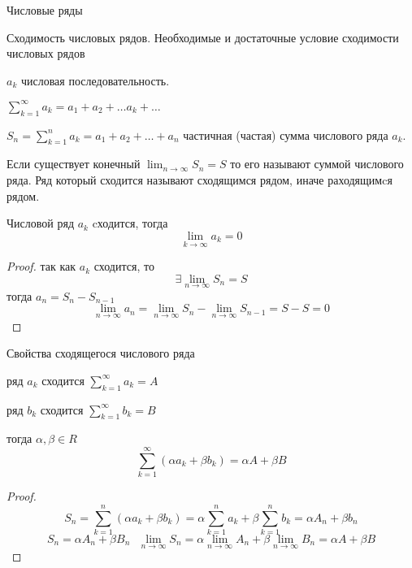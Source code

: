 \begin{title}
  Числовые ряды
\end{title}

\begin{title}[\Large]
  Сходимость числовых рядов. Необходимые и достаточные условие сходимости
  числовых рядов
\end{title}

  $a_k$ числовая последовательность.

  $\sum_{k=1}^{\infty} a_k = a_1 + a_2 + \ldots a_k + \ldots$

  $S_n = \sum_{k=1}^n a_k = a_1 + a_2 + \ldots + a_n$ частичная (частая)
сумма числового ряда $a_k$.

  Если существует конечный $\lim_{n \to \infty} S_n = S$ то его называют суммой
числового ряда. Ряд который сходится называют сходящимся рядом, иначе
раходящимcя рядом.

\begin{block}
  Числовой ряд $a_k$ cходится, тогда
  $$
  \lim_{k \to \infty} a_k = 0
  $$
\end{block}

\begin{proof}
  так как $a_k$ сходится, то
  $$
  \exists \lim_{n \to \infty} S_n = S  $$
  тогда $a_n = S_n - S_{n-1}$
  $$
  \lim_{n \to \infty} a_n = \lim_{n \to \infty} S_n -
  \lim_{n \to \infty} S_{n-1} = S - S = 0
  $$
\end{proof}

\begin{title}[\Large]
  Свойства сходящегося числового ряда
\end{title}

\begin{theorem}
  ряд $a_k$ сходится $\sum_{k=1}^{\infty} a_k = A$

  ряд $b_k$ сходится $\sum_{k=1}^{\infty} b_k = B$

  тогда $\alpha, \beta \in R$
  $$
  \sum_{k=1}^{\infty} (\alpha a_k + \beta b_k) = \alpha A + \beta B
  $$
\end{theorem}

\begin{proof}
  $$
  S_n = \sum_{k=1}^n (\alpha a_k + \beta b_k) =
  \alpha \sum_{k=1}^n a_k + \beta \sum_{k=1}^n b_k = \alpha A_n + \beta b_n
  $$
  $$
  S_n = \alpha A_n + \beta B_n ~~~
  \lim_{n \to \infty} S_n = \alpha \lim_{n \to \infty} A_n +
  \beta \lim_{n \to \infty} B_n = \alpha A + \beta B
  $$
\end{proof}

